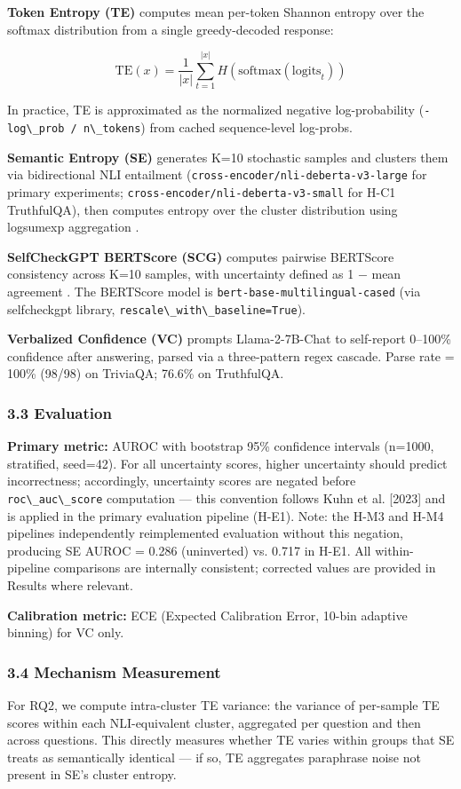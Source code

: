 \textbf{Token Entropy (TE)} computes mean per-token Shannon entropy over the softmax distribution from a single greedy-decoded response:

$$\text{TE}(x) = \frac{1}{|x|} \sum_{t=1}^{|x|} H\!\left(\text{softmax}(\text{logits}_t)\right)$$

In practice, TE is approximated as the normalized negative log-probability (\texttt{-log\textbackslash \_prob / n\textbackslash \_tokens}) from cached sequence-level log-probs.

\textbf{Semantic Entropy (SE)} generates K=10 stochastic samples and clusters them via bidirectional NLI entailment (\texttt{cross-encoder/nli-deberta-v3-large} for primary experiments; \texttt{cross-encoder/nli-deberta-v3-small} for H-C1 TruthfulQA), then computes entropy over the cluster distribution using logsumexp aggregation \citep{Kuhn2023Semantic}.

\textbf{SelfCheckGPT BERTScore (SCG)} computes pairwise BERTScore consistency across K=10 samples, with uncertainty defined as 1 $-$ mean agreement \citep{Manakul2023SelfCheckGPT}. The BERTScore model is \texttt{bert-base-multilingual-cased} (via selfcheckgpt library, \texttt{rescale\textbackslash \_with\textbackslash \_baseline=True}).

\textbf{Verbalized Confidence (VC)} prompts Llama-2-7B-Chat to self-report 0--100\% confidence after answering, parsed via a three-pattern regex cascade. Parse rate = 100\% (98/98) on TriviaQA; 76.6\% on TruthfulQA.

\subsubsection{3.3 Evaluation}

\textbf{Primary metric:} AUROC with bootstrap 95\% confidence intervals (n=1000, stratified, seed=42). For all uncertainty scores, higher uncertainty should predict incorrectness; accordingly, uncertainty scores are negated before \texttt{roc\textbackslash \_auc\textbackslash \_score} computation --- this convention follows Kuhn et al. [2023] and is applied in the primary evaluation pipeline (H-E1). Note: the H-M3 and H-M4 pipelines independently reimplemented evaluation without this negation, producing SE AUROC = 0.286 (uninverted) vs. 0.717 in H-E1. All within-pipeline comparisons are internally consistent; corrected values are provided in Results where relevant.

\textbf{Calibration metric:} ECE (Expected Calibration Error, 10-bin adaptive binning) for VC only.

\subsubsection{3.4 Mechanism Measurement}

For RQ2, we compute intra-cluster TE variance: the variance of per-sample TE scores within each NLI-equivalent cluster, aggregated per question and then across questions. This directly measures whether TE varies within groups that SE treats as semantically identical --- if so, TE aggregates paraphrase noise not present in SE's cluster entropy.

